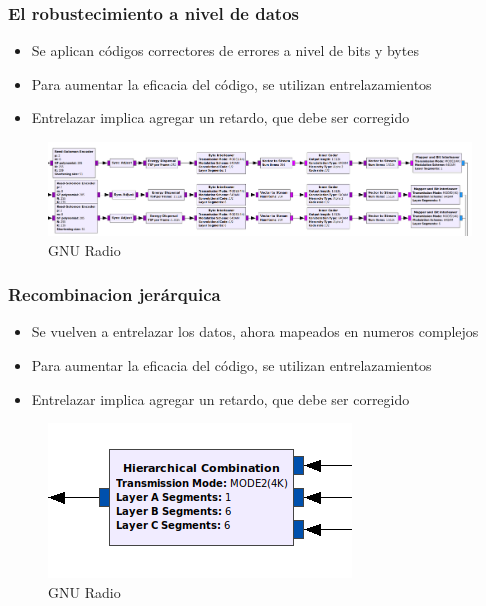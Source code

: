 \begin{frame}
\frametitle{El robustecimiento a nivel de datos}
\begin{itemize}	
	\item { Se aplican códigos correctores de errores a nivel de bits y bytes}
	\item {	Para aumentar la eficacia del código, se utilizan entrelazamientos}
	\item { Entrelazar implica agregar un retardo, que debe ser corregido }
\end{itemize}
\begin{figure}
	\includegraphics[scale=0.22]{rob_datos}
	\caption{GNU Radio}
\end{figure}
\end{frame}
\begin{frame}
\frametitle{Recombinacion jerárquica}
\begin{itemize}	
	\item { Se vuelven a entrelazar los datos, ahora mapeados en numeros complejos}
	\item {	Para aumentar la eficacia del código, se utilizan entrelazamientos}
	\item { Entrelazar implica agregar un retardo, que debe ser corregido }
\end{itemize}
\begin{figure}
	\includegraphics[scale=0.55]{h_conv}
	\caption{GNU Radio}
\end{figure}
\end{frame}
